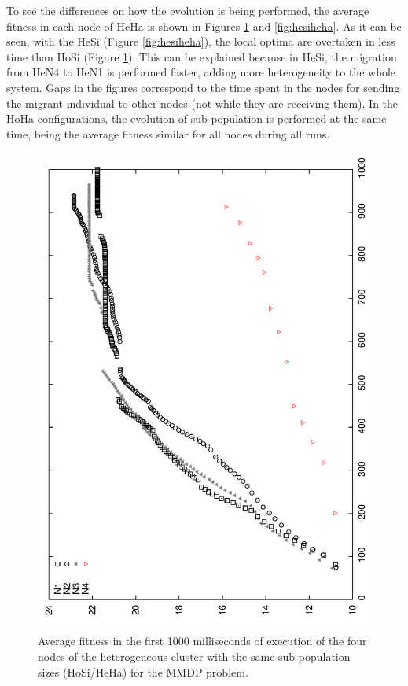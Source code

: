 To see the differences on how the evolution is being performed, the
average fitness in each node of HeHa is shown in Figures
\ref{fig:hosiheha} and \ref{fig:hesiheha}. As it can be seen, with the
HeSi (Figure \ref{fig:hesiheha}), the local optima are overtaken in
less time than HoSi (Figure \ref{fig:hosiheha}).  This can be
explained because in HeSi, the migration from HeN4 to HeN1 is
performed faster, adding more heterogeneity to the whole system. Gaps
in the figures correspond to the time spent in the nodes for sending
the migrant individual to other nodes (not while they are receiving
them). %
 In the HoHa configurations, the evolution of sub-population is
 performed at the same time, being the average fitness similar for all
 nodes during all runs.  


\begin{figure}
\centering
 \includegraphics[angle=-90,scale =0.4] {gfx/adaptiveresults/generationsMMDPhomosize.pdf}
\caption{Average fitness in the first 1000 milliseconds of execution of the four nodes of the heterogeneous cluster with the same sub-population sizes (HoSi/HeHa) for the MMDP problem.}
\label{fig:hosiheha}
\end{figure}

